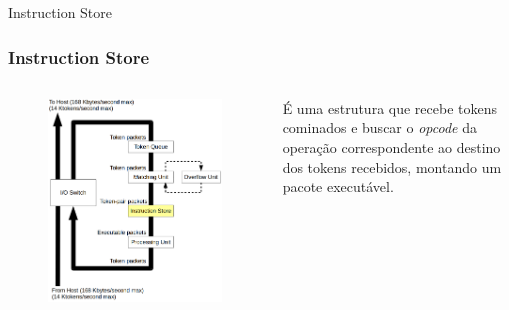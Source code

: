 \documentclass{beamer}
\begin{document}
\begin{frame}{Instruction Store}
	\subsubsection{Instruction Store}
	\begin{columns}
		\column{6cm}
			\begin{figure}
				\centering
				\includegraphics[width=\textwidth]{InstructionStore}
			\end{figure}

			É uma estrutura que recebe tokens cominados e buscar o {\em opcode} da operação correspondente ao destino dos tokens recebidos, montando um pacote executável.
	\end{columns}
\end{frame}
\end{document}
